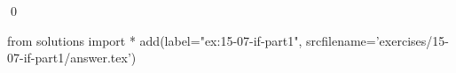 
\begin{ex}
  \label{ex:15-07-if-part1}
  
  \qed
\end{ex}
\begin{python0}
from solutions import *
add(label="ex:15-07-if-part1",
    srcfilename='exercises/15-07-if-part1/answer.tex')
\end{python0}
